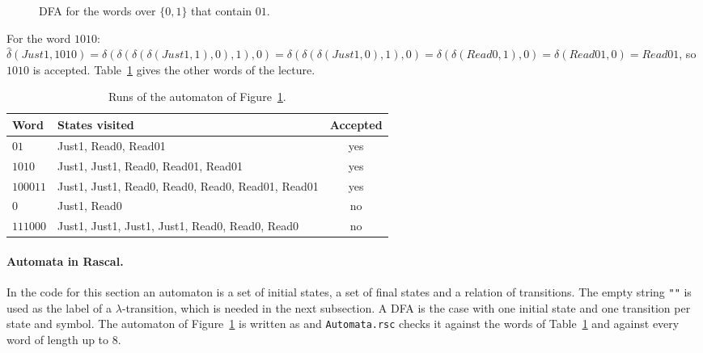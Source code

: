 \begin{figure}[h]
\centering
{}
\caption{DFA for the words over $\{0,1\}$ that contain $01$.}
\label{fig:contains01}
\end{figure}

For the word $1010$:
$\hat\delta(\mathit{Just1}, 1010) = \delta(\delta(\delta(\delta(\mathit{Just1}, 1), 0), 1), 0)
= \delta(\delta(\delta(\mathit{Just1}, 0), 1), 0) = \delta(\delta(\mathit{Read0}, 1), 0)
= \delta(\mathit{Read01}, 0) = \mathit{Read01}$, so $1010$ is accepted.
Table~\ref{tab:contains01} gives the other words of the lecture.

\begin{table}[h]
\centering
\small
\begin{tabular}{l l c}
  \toprule
  Word & States visited & Accepted \\
  \midrule
  $01$     & Just1, Read0, Read01                          & yes \\
  $1010$   & Just1, Just1, Read0, Read01, Read01           & yes \\
  $100011$ & Just1, Just1, Read0, Read0, Read0, Read01, Read01 & yes \\
  $0$      & Just1, Read0                                  & no \\
  $111000$ & Just1, Just1, Just1, Just1, Read0, Read0, Read0 & no \\
  \bottomrule
\end{tabular}
\caption{Runs of the automaton of Figure~\ref{fig:contains01}.}
\label{tab:contains01}
\end{table}

\paragraph{Automata in Rascal.} In the code for this section an automaton is a
set of initial states, a set of final states and a relation of transitions.
The empty string \texttt{""} is used as the label of a $\lambda$-transition,
which is needed in the next subsection. A DFA is the case with one initial
state and one transition per state and symbol.
The automaton of Figure~\ref{fig:contains01} is written as
and \texttt{Automata.rsc} checks it against the words of
Table~\ref{tab:contains01} and against every word of length up to 8.

